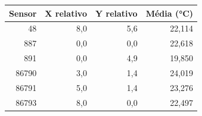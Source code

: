 \begin{tabular}{rrrr}
\toprule
Sensor & X relativo & Y relativo & Média (°C) \\
\midrule
48 & 8,0 & 5,6 & 22,114 \\
887 & 0,0 & 0,0 & 22,618 \\
891 & 0,0 & 4,9 & 19,850 \\
86790 & 3,0 & 1,4 & 24,019 \\
86791 & 5,0 & 1,4 & 23,276 \\
86793 & 8,0 & 0,0 & 22,497 \\
\bottomrule
\end{tabular}

